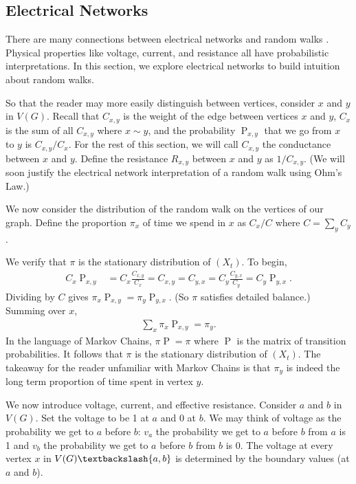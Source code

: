 \documentclass[12pt]{article}
\theoremstyle{definition}
\DeclareMathOperator{\pr}{\mathrm{P}}		     %
\begin{document}
\subsection{Electrical Networks \label{sec:electric}}

There are many connections between electrical networks
and random walks \cite{Bo98}.
Physical properties like voltage, current, and resistance
all have probabilistic interpretations.
In this section, we explore electrical networks to build intuition about 
random walks.

So that the reader may more easily distinguish between
vertices, consider $x$ and $y$ in $V(G)$.
Recall that $C_{x,y}$ is the weight of the edge
between vertices $x$ and $y$, $C_x$ is the sum
of all $C_{x,y}$ where $x \sim y$, and the probability $\pr_{x,y}$
that we go from $x$ to $y$ is $C_{x,y}/C_x$.
For the rest of this section, we will call $C_{x,y}$
the conductance between $x$ and $y$.
Define the resistance $R_{x,y}$ between $x$ and $y$
as $1/ C_{x,y}$.
(We will soon justify the electrical network interpretation of
a random walk using Ohm's Law.)

We now consider the distribution of the random
walk on the vertices of our graph.
Define the proportion $\pi_x$ of time we spend in $x$
as $C_x/C$ where $C=\sum_y C_y$.

We verify that $\pi$ is the stationary distribution
of $(X_t)$.
To begin,
\begin{align}
C_x \pr_{x,y} &= C_x \frac{C_{x,y}}{C_x} = C_{x,y} = C_{y,x} 
= C_y \frac{C_{y,x}}{C_y} = C_y \pr_{y,x}. \nonumber
\end{align}
Dividing by $C$ gives $\pi_x \pr_{x,y} = \pi_y \pr_{y,x}$.
(So $\pi$ satisfies detailed balance.)
Summing over $x$,
\begin{align}
\sum_x \pi_x \pr_{x,y} = \pi_y . \nonumber
\end{align}
In the language of Markov Chains,
$\pi \pr = \pi$ where $\pr$ is the matrix of transition probabilities.
It follows that $\pi$ is the stationary distribution of $(X_t)$.
The takeaway for the reader unfamiliar with Markov Chains is that
$\pi_y$ is indeed the long term proportion of time spent in vertex $y$.

We now introduce voltage, current, and effective resistance.
Consider $a$ and $b$ in $V(G)$.
Set the voltage to be 1 at $a$ and 0 at $b$.
We may think of voltage as the probability we get to $a$ before $b$:
$v_a$ the probability we get to $a$ before $b$ from $a$
is 1 and $v_b$ the probability we get to $a$ before $b$ from $b$ is 0.
The voltage at every vertex $x$ in  $V(G) \textbackslash \{a,b\}$
is determined by the boundary values (at $a$ and $b$).
\end{document}
